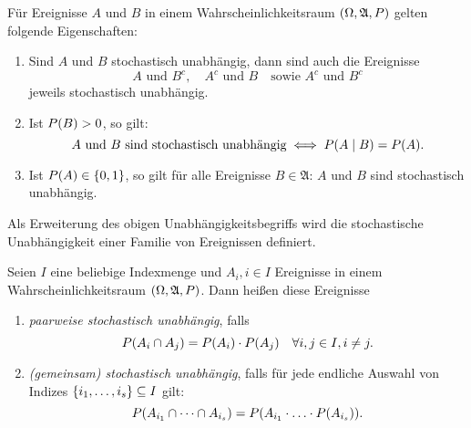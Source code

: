 \documentclass{lecture}
\begin{document}
    \begin{lemma}
        Für Ereignisse \(A\) und \(B\) in einem Wahrscheinlichkeitsraum \(\parentheses*{\Omega, \mathfrak{A}, P}\) gelten folgende Eigenschaften:
        \begin{enumerate}
            \item Sind \(A\) und \(B\) stochastisch unabhängig, dann sind auch die Ereignisse
            \[
                A\text{ und }B^c, \quad A^c\text{ und }B \quad \text{sowie }A^c\text{ und }B^c
            \]
            jeweils stochastisch unabhängig.
            \item Ist \(P\parentheses*{B} > 0\), so gilt:
            \[
                A\text{ und }B\text{ sind stochastisch unabhängig} \iff P\parentheses*{A \mid B} = P\parentheses*{A}.
            \]
            \item Ist \(P\parentheses*{A} \in \braces*{0, 1}\), so gilt für alle Ereignisse \(B \in \mathfrak{A}\): \(A\) und \(B\) sind stochastisch unabhängig.
        \end{enumerate}
    \end{lemma}

    Als Erweiterung des obigen Unabhängigkeitsbegriffs wird die stochastische Unabhängigkeit einer Familie von Ereignissen definiert.

    \begin{definition}
        Seien \(I\) eine beliebige Indexmenge und \(A_i, i \in I\) Ereignisse in einem Wahrscheinlichkeitsraum \(\parentheses*{\Omega, \mathfrak{A}, P}\).
        Dann heißen diese Ereignisse
        \begin{enumerate}
            \item \emph{paarweise stochastisch unabhängig}, falls
            \[
                P\parentheses*{A_i \cap A_j} = P\parentheses*{A_i} \cdot P\parentheses*{A_j} \quad \forall i, j \in I, i \ne j.
            \]
            \item \emph{(gemeinsam) stochastisch unabhängig}, falls für jede endliche Auswahl von Indizes \(\braces*{i_1, \ldots, i_s} \subseteq I\) gilt:
            \[
                P\parentheses*{A_{i_1} \cap \cdots \cap A_{i_s}} = P\parentheses*{A_{i_1} \cdot \ldots \cdot P\parentheses*{A_{i_s}}}.
            \]
        \end{enumerate}
    \end{definition}
\end{document}
